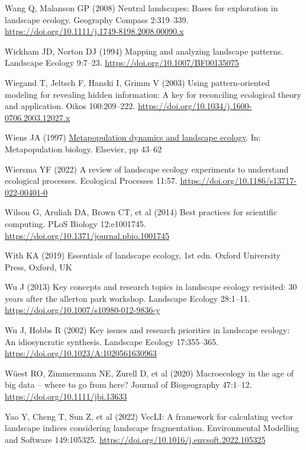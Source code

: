 \documentclass[
  12pt,
  a4paperpaper,
]{article}
\newlength{\cslhangindent}
\newenvironment{CSLReferences}[2] %
 {\begin{list}{}{%
  \setlength{\itemindent}{0pt}
  \setlength{\leftmargin}{0pt}
  \setlength{\parsep}{0pt}
  \ifodd #1
   \setlength{\leftmargin}{\cslhangindent}
   \setlength{\itemindent}{-1\cslhangindent}
  \fi
  \setlength{\itemsep}{#2\baselineskip}}}
 {\end{list}}
\begin{document}
\begin{CSLReferences}{1}{1}
Wang Q, Malanson GP (2008) Neutral landscapes: Bases for exploration in
landscape ecology. Geography Compass 2:319--339.
\url{https://doi.org/10.1111/j.1749-8198.2008.00090.x}

Wickham JD, Norton DJ (1994) Mapping and analyzing landscape patterns.
Landscape Ecology 9:7--23. \url{https://doi.org/10.1007/BF00135075}

Wiegand T, Jeltsch F, Hanski I, Grimm V (2003) Using pattern-oriented
modeling for revealing hidden information: A key for reconciling
ecological theory and application. Oikos 100:209--222.
\url{https://doi.org/10.1034/j.1600-0706.2003.12027.x}

Wiens JA (1997)
\href{https://doi.org/10.1016/B978-012323445-2/50005-5}{Metapopulation
dynamics and landscape ecology}. In: Metapopulation biology. Elsevier,
pp 43--62

Wiersma YF (2022) A review of landscape ecology experiments to
understand ecological processes. Ecological Processes 11:57.
\url{https://doi.org/10.1186/s13717-022-00401-0}

Wilson G, Aruliah DA, Brown CT, et al (2014) Best practices for
scientific computing. PLoS Biology 12:e1001745.
\url{https://doi.org/10.1371/journal.pbio.1001745}

With KA (2019) Essentials of landscape ecology, 1st edn. Oxford
University Press, Oxford, UK

Wu J (2013) Key concepts and research topics in landscape ecology
revisited: 30 years after the allerton park workshop. Landscape Ecology
28:1--11. \url{https://doi.org/10.1007/s10980-012-9836-y}

Wu J, Hobbs R (2002) Key issues and research priorities in landscape
ecology: An idiosyncratic synthesis. Landscape Ecology 17:355--365.
\url{https://doi.org/10.1023/A:1020561630963}

Wüest RO, Zimmermann NE, Zurell D, et al (2020) Macroecology in the age
of big data -- where to go from here? Journal of Biogeography 47:1--12.
\url{https://doi.org/10.1111/jbi.13633}

Yao Y, Cheng T, Sun Z, et al (2022) VecLI: A framework for calculating
vector landscape indices considering landscape fragmentation.
Environmental Modelling and Software 149:105325.
\url{https://doi.org/10.1016/j.envsoft.2022.105325}


\end{CSLReferences}
\end{document}
